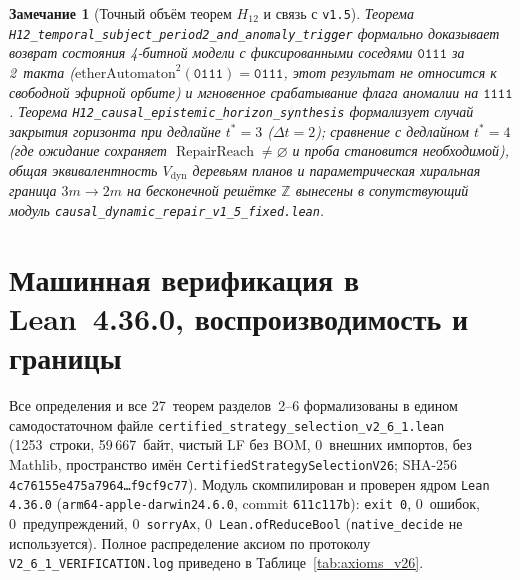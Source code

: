 \documentclass[11pt,a4paper]{article}
\theoremstyle{cleanthm}
\theoremstyle{cleandef}
\newtheorem{remark}[theorem]{Замечание}
\DeclareMathOperator{\RepairReach}{RepairReach}
\begin{document}
\begin{remark}[Точный объём теорем $H_{12}$ и связь с \texttt{v1.5}]
\label{rem:h12_scope}
Теорема \texttt{H12\_temporal\_\allowbreak subject\_\allowbreak period2\_\allowbreak and\_\allowbreak anomaly\_\allowbreak trigger} формально доказывает возврат состояния 4-битной модели с фиксированными соседями $\mathtt{0111}$ за 2~такта ($\mathrm{etherAutomaton}^2(\mathtt{0111})=\mathtt{0111}$, этот результат не относится к свободной эфирной орбите) и мгновенное срабатывание флага аномалии на $\mathtt{1111}$. Теорема \texttt{H12\_causal\_\allowbreak epistemic\_\allowbreak horizon\_\allowbreak synthesis} формализует случай закрытия горизонта при дедлайне $t^*=3$ ($\Delta t=2$); сравнение с дедлайном $t^*=4$ (где ожидание сохраняет $\RepairReach\neq\varnothing$ и проба становится необходимой), общая эквивалентность $V_{\mathrm{dyn}}$ деревьям планов и параметрическая хиральная граница $3m\to 2m$ на бесконечной решётке $\mathbb{Z}$ вынесены в сопутствующий модуль \texttt{causal\_dynamic\_repair\_v1\_5\_fixed.lean}.
\end{remark}

\section{Машинная верификация в Lean~4.36.0, воспроизводимость и границы}

Все определения и все 27~теорем разделов~2--6 формализованы в едином самодостаточном файле \texttt{certified\_\allowbreak strategy\_\allowbreak selection\_\allowbreak v2\_6\_1.lean} (1253~строки, 59\,667~байт, чистый LF без BOM, 0~внешних импортов, без Mathlib, пространство имён \texttt{CertifiedStrategySelectionV26}; SHA-256 \texttt{4c76155e475a7964\ldots{}f9cf9c77}). Модуль скомпилирован и проверен ядром \texttt{Lean 4.36.0} (\texttt{arm64-apple-darwin24.6.0}, commit \texttt{611c117b}): \texttt{exit 0}, 0~ошибок, 0~предупреждений, 0~\texttt{sorryAx}, 0~\texttt{Lean.ofReduceBool} (\texttt{native\_decide} не используется). Полное распределение аксиом по протоколу \texttt{V2\_6\_1\_VERIFICATION.log} приведено в Таблице~\ref{tab:axioms_v26}.
\end{document}
